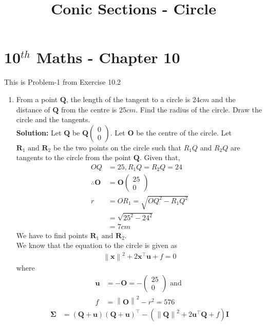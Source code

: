 \documentclass[12pt]{article}
\providecommand{\brak}[1]{\ensuremath{\left(#1\right)}}
\providecommand{\norm}[1]{\left\lVert#1\right\rVert}
\newcommand{\solution}{\noindent \textbf{Solution: }}
\newcommand{\myvec}[1]{\ensuremath{\begin{pmatrix}#1\end{pmatrix}}}
\let\vec\mathbf
\begin{document}
\begin{center}
\title{\textbf{Conic Sections - Circle}}
\date{\vspace{-5ex}} %
\maketitle
\end{center}
\setcounter{page}{1}

\section{10$^{th}$ Maths - Chapter 10}
This is Problem-1 from Exercise 10.2
\begin{enumerate}
\item From a point $\vec{Q}$, the length of the tangent to a circle is $24 cm$ and the distance of $\vec{Q}$ from the centre is $25 cm$. Find the radius of the circle. Draw the circle and the tangents. \\ 
\solution 
Let $\vec{Q}$ be $\vec{Q}\myvec{0 \\ 0}$. Let $\vec{O}$ be the centre of the circle. Let $\vec{R}_1 \text{ and } \vec{R}_2$ be the two points on the circle such that $R_1Q$ and $R_2Q$ are tangents to the circle from the point $\vec{Q}$. Given that,  
\begin{align}
	OQ &= 25, R_1Q = R_2Q = 24 \\ 
	\therefore \vec{O} &= \vec{O}\myvec{25 \\ 0} \\
	r &= OR_1 = \sqrt{OQ^2 - R_1Q^2}  \\
	&= \sqrt{25^2 - 24^2} \\
	&= 7cm
\end{align}
We have to find points $\vec{R}_1 \text{ and } \vec{R}_2$. \\
We know that the equation to the circle is given as
\begin{align}
	\label{eq:circEq1}
	\norm{\vec{x}}^2+2\vec{x}^\top\vec{u}+f = 0 
\end{align}
where
\begin{align}
	\vec{u} &= -\vec{O}  = -\myvec{25 \\ 0}\text{ and } \\
        \label{eq:fRelation}
	f &= \norm{\vec{O}}^2 - r^2 = 576
\end{align}
\begin{align}
	\vec{\Sigma} &= \brak{\vec{Q}+\vec{u}}\brak{\vec{Q}+\vec{u}}^\top - \brak{\norm{\vec{Q}}^2+2\vec{u}^\top\vec{Q}+f}\vec{I}

\end{align}
\end{enumerate}
\end{document}
